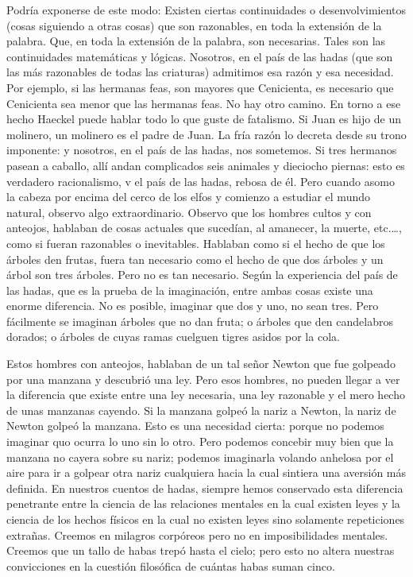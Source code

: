 Podría exponerse de este modo: Existen ciertas continuidades o desenvolvimientos (cosas siguiendo
a otras cosas) que son razonables, en toda la extensión de la palabra. Que, en toda la extensión de la
palabra, son necesarias. Tales son las continuidades matemáticas y lógicas. Nosotros, en el país de las
hadas (que son las más razonables de todas las criaturas) admitimos esa razón y esa necesidad. Por
ejemplo, si las hermanas feas, son mayores que Cenicienta, es necesario que Cenicienta sea menor que las
hermanas feas. No hay otro camino. En torno a ese hecho Haeckel puede hablar todo lo que guste de
fatalismo. Si Juan es hijo de un molinero, un molinero es el padre de Juan. La fría razón lo decreta desde
su trono imponente: y nosotros, en el país de las hadas, nos sometemos. Si tres hermanos pasean a
caballo, allí andan complicados seis animales y dieciocho piernas: esto es verdadero racionalismo, v el
país de las hadas, rebosa de él. Pero cuando asomo la cabeza por encima del cerco de los elfos y
comienzo a estudiar el mundo natural, observo algo extraordinario. Observo que los hombres cultos y con
anteojos, hablaban de cosas actuales que sucedían, al amanecer, la muerte, etc.…, como si fueran
razonables o inevitables. Hablaban como si el hecho de que los árboles den frutas, fuera tan necesario
como el hecho de que dos árboles y un árbol son tres árboles. Pero no es tan necesario. Según la
experiencia del país de las hadas, que es la prueba de la imaginación, entre ambas cosas existe una
enorme diferencia. No es posible, imaginar que dos y uno, no sean tres. Pero fácilmente se imaginan
árboles que no dan fruta; o árboles que den candelabros dorados; o árboles de cuyas ramas cuelguen tigres
asidos por la cola.

Estos hombres con anteojos, hablaban de un tal señor Newton que fue golpeado por una manzana y
descubrió una ley. Pero esos hombres, no pueden llegar a ver la diferencia que existe entre una ley
necesaria, una ley razonable y el mero hecho de unas manzanas cayendo. Si la manzana golpeó la nariz a
Newton, la nariz de Newton golpeó la manzana. Esto es una necesidad cierta: porque no podemos
imaginar quo ocurra lo uno sin lo otro. Pero podemos concebir muy bien que la manzana no cayera sobre
su nariz; podemos imaginarla volando anhelosa por el aire para ir a golpear otra nariz cualquiera hacia la
cual sintiera una aversión más definida. En nuestros cuentos de hadas, siempre hemos conservado esta
diferencia penetrante entre la ciencia de las relaciones mentales en la cual existen leyes y la ciencia de los
hechos físicos en la cual no existen leyes sino solamente repeticiones extrañas. Creemos en milagros
corpóreos pero no en imposibilidades mentales. Creemos que un tallo de habas trepó hasta el cielo; pero
esto no altera nuestras convicciones en la cuestión filosófica de cuántas habas suman cinco.

